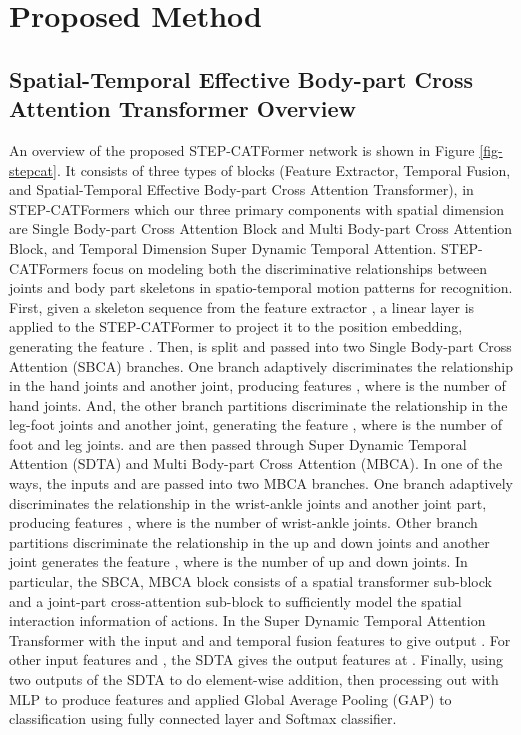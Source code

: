 \documentclass{bmvc2k}
\begin{document}
\section{Proposed Method}















\subsection{Spatial-Temporal Effective Body-part Cross Attention Transformer Overview}
An overview of the proposed STEP-CATFormer network is shown in Figure \ref{fig-stepcat}. It consists of three types of blocks (Feature Extractor, Temporal Fusion, and Spatial-Temporal Effective Body-part Cross Attention Transformer), in STEP-CATFormers which our three primary components with spatial dimension are Single Body-part Cross Attention Block and Multi Body-part Cross Attention Block, and Temporal Dimension Super Dynamic Temporal Attention. STEP-CATFormers focus on modeling both the discriminative relationships between joints and body part skeletons in spatio-temporal motion patterns for recognition. First, given a skeleton sequence from the feature extractor , a linear layer is applied to the STEP-CATFormer to project it to the position embedding, generating the feature .
Then,  is split and passed into two Single Body-part Cross Attention (SBCA) branches. One branch adaptively discriminates the relationship in the hand joints and another joint, producing features , where   is the number of hand joints. And, the other branch partitions discriminate the relationship in the leg-foot joints and another joint, generating the feature , where  is the number of foot and leg joints.  and  are then passed through Super Dynamic Temporal Attention (SDTA) and Multi Body-part Cross Attention (MBCA). In one of the ways, the inputs  and  are passed into two MBCA branches. One branch adaptively discriminates the relationship in the wrist-ankle joints and another joint part, producing features , where  is the number of wrist-ankle joints. Other branch partitions discriminate the relationship in the up and down joints and another joint generates the feature , where  is the number of up and down joints. In particular, the SBCA, MBCA block consists of a spatial transformer sub-block and a joint-part cross-attention sub-block to sufficiently model the spatial interaction information of actions. In the Super Dynamic Temporal Attention Transformer with the input  and  and temporal fusion features to give output . For other input features  and , the SDTA gives the output features at . Finally, using two outputs of the SDTA to do element-wise addition, then processing out with MLP to produce features and applied Global Average Pooling (GAP)  to classification using fully connected layer and Softmax classifier.
\end{document}
